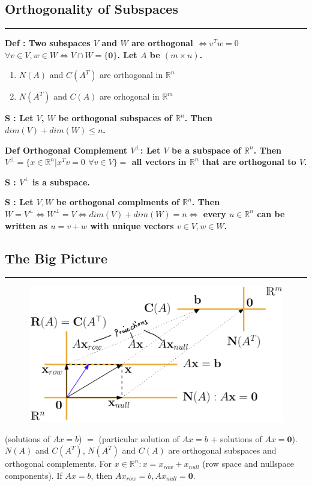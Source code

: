 \documentclass[7pt,landscape, margin = 0.1mm]{article}
\newcommand*{\mysubsection}[1]{\vspace{-2mm}\color{chaptercolor}\subsection{ #1 }
\vspace{-1mm}\hrule\vspace{1.5mm}\color{black}
\vspace{2mm}}
\newcommand{\DEF}[2]{\color{chaptercolor}\bf{Def #1}:\color{black}    \hspace{0.2cm} #2}
\newcommand{\SA}[2]{\color{chaptercolor}\bf{S #1}:\color{black}    \hspace{0.2cm} #2}
\begin{document}
\begin{multicols}{4}
\begin{flushleft}
{{\mysubsection{Orthogonality of Subspaces}
\DEF{}{Two subspaces $V$ and $W$ are orthogonal $\Leftrightarrow v^Tw=0 $ $\forall v\in V, w\in W \Leftrightarrow V \cap W = \{\bm{0}\}$. Let $A$ be $(m\times n)$.
\begin{enumerate}[nolistsep]
    \item $N(A)$ and $C(A^T)$ are orthogonal in $\mathbb{R}^n$
    \item $N(A^T)$ and $C(A)$ are orhogonal in $\mathbb{R}^m$
\end{enumerate}}

\SA{}{Let $V$, $W$ be orthogonal subspaces of $\mathbb{R}^n$. Then $dim(V)+dim(W)\leq n$.}

\DEF{Orthogonal Complement $V^{\perp}$}{Let $V$ be a subspace of $\mathbb{R}^n$. Then $V^{\perp}=\{x\in\mathbb{R}^n|x^Tv=0$ $\forall v\in V\} =$ all vectors in $\mathbb{R}^n$ that are orthogonal to $V$.}

\SA{}{$V^{\perp}$ is a subspace.}

\SA{}{Let $V,W$ be orthogonal complments of $\mathbb{R}^n$. Then $W=V^{\perp} \Leftrightarrow W^{\perp}=V \Leftrightarrow dim(V)+dim(W)=n \Leftrightarrow$ every $u\in \mathbb{R}^n$ can be written as $u=v+w$ with unique vectors $v\in V, w\in W$.}

\mysubsection{The Big Picture}
\hspace{1px}
\begin{figure}[H]
 \centering
 \includegraphics[width=\linewidth,keepaspectratio]{pictures/the_big_picture.png} 
\end{figure}

(solutions of $Ax=b$) $=$ (\color{blue}particular solution \color{black}of $Ax=b$ + solutions of $Ax=\bm{0}$). $N(A)$ and $C(A^T)$, $N(A^T)$ and $C(A)$ are orthogonal subspaces and orthogonal complements. For $x\in\mathbb{R}^n: x=x_{row}+x_{null}$ (row space and nullspace components). If $Ax=b$, then $Ax_{row}=b, Ax_{null}=\bm{0}$.




}}
\end{flushleft}
\end{multicols}
\end{document}
